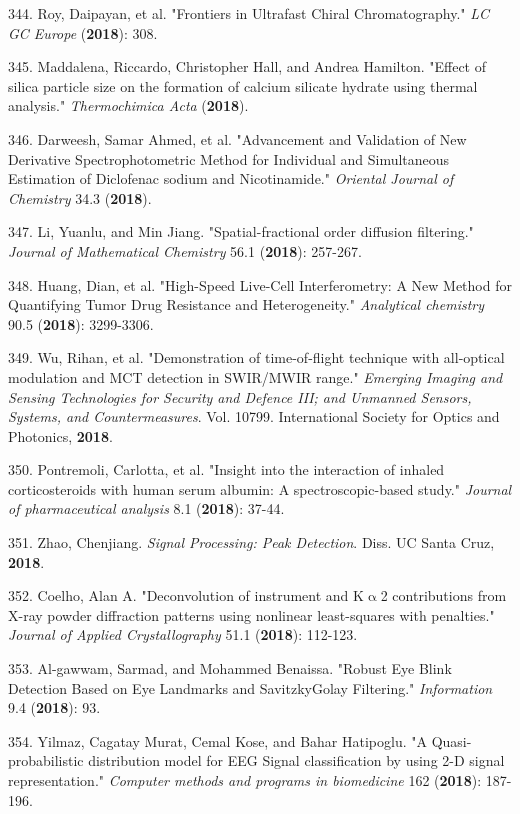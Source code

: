 344. Roy, Daipayan, et al. "Frontiers in Ultrafast Chiral Chromatography." \textit{LC{\textbullet} GC Europe} (\textbf{2018}): 308.

345. Maddalena, Riccardo, Christopher Hall, and Andrea Hamilton. "Effect of silica particle size on the formation of calcium silicate hydrate using thermal analysis." \textit{Thermochimica Acta} (\textbf{2018}).

346. Darweesh, Samar Ahmed, et al. "Advancement and Validation of New Derivative Spectrophotometric Method for Individual and Simultaneous Estimation of Diclofenac sodium and Nicotinamide." \textit{Oriental Journal of Chemistry} 34.3 (\textbf{2018}).

347. Li, Yuanlu, and Min Jiang. "Spatial-fractional order diffusion filtering." \textit{Journal of Mathematical Chemistry} 56.1 (\textbf{2018}): 257-267.

348. Huang, Dian, et al. "High-Speed Live-Cell Interferometry: A New Method for Quantifying Tumor Drug Resistance and Heterogeneity." \textit{Analytical chemistry} 90.5 (\textbf{2018}): 3299-3306.

349. Wu, Rihan, et al. "Demonstration of time-of-flight technique with all-optical modulation and MCT detection in SWIR/MWIR range." \textit{Emerging Imaging and Sensing Technologies for Security and Defence III; and Unmanned Sensors, Systems, and Countermeasures}. Vol. 10799. International Society for Optics and Photonics, \textbf{2018}.

350. Pontremoli, Carlotta, et al. "Insight into the interaction of inhaled corticosteroids with human serum albumin: A spectroscopic-based study." \textit{Journal of pharmaceutical analysis} 8.1 (\textbf{2018}): 37-44.

351. Zhao, Chenjiang. \textit{Signal Processing: Peak Detection}. Diss. UC Santa Cruz, \textbf{2018}.

352. Coelho, Alan A. "Deconvolution of instrument and K${\upalpha}$2 contributions from X-ray powder diffraction patterns using nonlinear least-squares with penalties." \textit{Journal of Applied Crystallography} 51.1 (\textbf{2018}): 112-123.

353. Al-gawwam, Sarmad, and Mohammed Benaissa. "Robust Eye Blink Detection Based on Eye Landmarks and Savitzky\textendash{}Golay Filtering." \textit{Information} 9.4 (\textbf{2018}): 93.

354. Yilmaz, Cagatay Murat, Cemal Kose, and Bahar Hatipoglu. "A Quasi-probabilistic distribution model for EEG Signal classification by using 2-D signal representation." \textit{Computer methods and programs in biomedicine} 162 (\textbf{2018}): 187-196.

